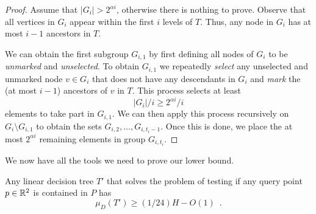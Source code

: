 \documentclass[charterfonts,lotsofwhite]{patmorin}
\begin{document}
\begin{proof}
Assume that $|G_i|> 2^{\alpha i}$, otherwise there is nothing to
prove.  Observe that all vertices in $G_i$ appear within the first $i$
levels of $T$.  Thus, any node in $G_i$ has at most $i-1$ ancestors in
$T$.  

We can obtain the first subgroup $G_{i,1}$ by first defining all nodes of
$G_i$ to be \emph{unmarked} and \emph{unselected}.  To obtain
$G_{i,1}$ we repeatedly \emph{select} any unselected and unmarked
node $v\in G_i$ that does not have any descendants in $G_i$ and
\emph{mark} the (at most $i-1$) ancestors of $v$ in $T$.  This
process selects at least
\[
   |G_i|/i \ge 2^{\alpha i}/i
\] 
elements to take part in $G_{i,1}$.  We can then apply this process
recursively on $G_i\setminus G_{i,1}$ to obtain the sets
$G_{i,2},\ldots,G_{i,t_i-1}$.  Once this is done, we place the at most
$2^{\alpha i}$ remaining elements in group $G_{i,t_i}$.
\end{proof}

We now have all the tools we need to prove our lower bound.

\begin{thm}
Any linear decision tree $T'$ that solves the problem of testing 
if any query point 
$p\in\mathbb{R}^2$ is contained in $P$ has
\[
   \mu_D(T') \ge (1/24)H - O(1) \enspace .
\]
\end{thm}
\end{document}
